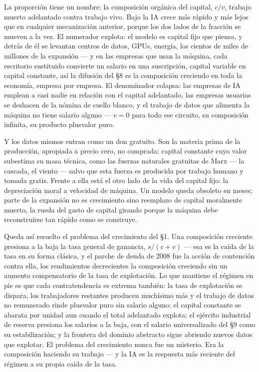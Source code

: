 \documentclass[11pt]{article}
\begin{document}
La proporción tiene un nombre: la composición orgánica del capital,
$c/v$, trabajo muerto adelantado contra trabajo vivo. Bajo la IA crece
más rápido y más lejos que en cualquier mecanización anterior, porque
los dos lados de la fracción se mueven a la vez. El numerador explota:
el modelo es capital fijo que piensa, y detrás de él se levantan
centros de datos, GPUs, energía, los cientos de miles de millones de la
expansión --- y en las empresas que usan la máquina, cada escritorio
sustituido convierte un salario en una suscripción, capital variable en
capital constante, así la difusión del §8 es la composición creciendo en
toda la economía, empresa por empresa. El denominador colapsa: las
empresas de IA emplean a casi nadie en relación con el capital
adelantado, las empresas usuarias se deshacen de la nómina de cuello
blanco, y el trabajo de datos que alimenta la máquina no tiene salario
alguno --- $v = 0$ para todo ese circuito, su composición infinita, su
producto plusvalor puro.

Y los datos mismos entran como un don gratuito. Son la materia prima de
la producción, apropiada a precio cero, no comprada: capital constante
cuyo valor subestima su masa técnica, como las fuerzas naturales
gratuitas de Marx --- la cascada, el viento --- salvo que esta fuerza
es producida por trabajo humano y tomada gratis. Frente a ella está el
otro lado de la vida del capital fijo: la depreciación moral a velocidad
de máquina. Un modelo queda obsoleto en meses; parte de la expansión no
es crecimiento sino reemplazo de capital moralmente muerto, la rueda del
gasto de capital girando porque la máquina debe reconstruirse tan rápido
como se construye.

Queda así resuelto el problema del crecimiento del §1. Una composición
creciente presiona a la baja la tasa general de ganancia, $s/(c+v)$ ---
esa es la caída de la tasa en su forma clásica, y el parche de deuda de
2008 fue la acción de contención contra ella, los rendimientos
decrecientes la composición creciendo sin un aumento compensatorio de la
tasa de explotación. Lo que mantiene el régimen en pie es que cada
contratendencia es extrema también: la tasa de explotación se dispara,
los trabajadores restantes producen muchísimo más y el trabajo de datos
no remunerado rinde plusvalor puro sin salario alguno; el capital
constante se abarata por unidad aun cuando el total adelantado explota;
el ejército industrial de reserva presiona los salarios a la baja, con
el salario universalizado del §9 como su estabilización; y la frontera
del dominio abstracto sigue abriendo nuevos datos que explotar. El
problema del crecimiento nunca fue un misterio. Era la composición
haciendo su trabajo --- y la IA es la respuesta más reciente del régimen
a su propia caída de la tasa.
\end{document}
